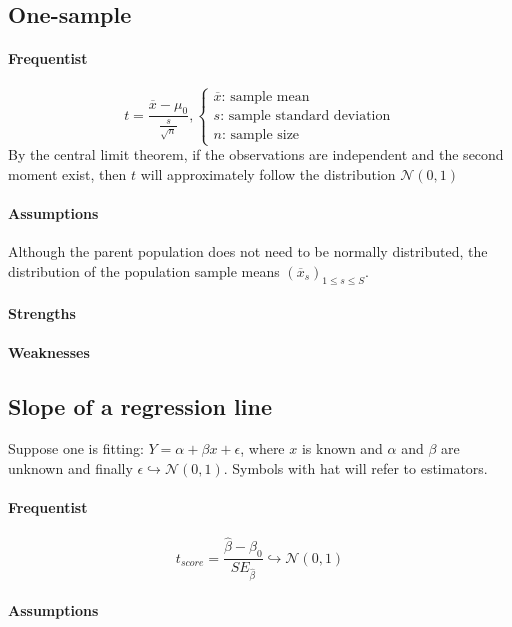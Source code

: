 \subsection{One-sample}
\paragraph{Frequentist}
$$
t = \dfrac{\overline{x} - \mu_{0}}{\frac{s}{\sqrt{n}}},
\begin{cases}
    \overline{x}\text{: sample mean}\\
    s\text{: sample standard deviation}\\
    n\text{: sample size}
\end{cases}
$$
By the central limit theorem, if the observations are independent and the second
moment exist, then $t$ will approximately follow the distribution $\mathcal{N}(0, 1)$

\paragraph{Assumptions}
Although the parent population does not need to be normally distributed, the distribution
of the population sample means $\left(\overline{x}_{s}\right)_{1\leq s\leq S}$.\\
\paragraph{Strengths}
\paragraph{Weaknesses}


\subsection{Slope of a regression line}
Suppose one is fitting: $Y = \alpha + \beta x + \epsilon$, where $x$ is known and $\alpha$ and $\beta$ are unknown
and finally $\epsilon \hookrightarrow \mathcal{N(0, 1)}$.
Symbols with hat will refer to estimators.
\paragraph{Frequentist}
$$t_{score} = \dfrac{\hat{\beta} - \beta_{0}}{SE_{\hat{\beta}}} \hookrightarrow \mathcal{N}(0, 1)$$

\paragraph{Assumptions}
